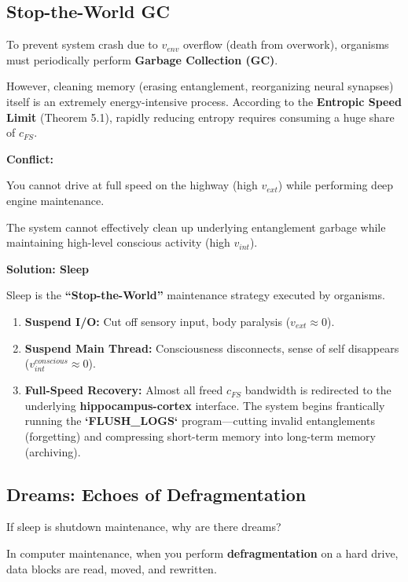 \documentclass[11pt,a4paper,twoside]{book}
\begin{document}
\subsection{Stop-the-World GC}

To prevent system crash due to \textbf{$v_{env}$} overflow (death from overwork), organisms must periodically perform \textbf{Garbage Collection (GC)}.

However, cleaning memory (erasing entanglement, reorganizing neural synapses) itself is an extremely energy-intensive process. According to the \textbf{Entropic Speed Limit} (Theorem 5.1), rapidly reducing entropy requires consuming a huge share of \textbf{$c_{FS}$}.

\textbf{Conflict:}

You cannot drive at full speed on the highway (high \textbf{$v_{ext}$}) while performing deep engine maintenance.

The system cannot effectively clean up underlying entanglement garbage while maintaining high-level conscious activity (high \textbf{$v_{int}$}).

\textbf{Solution: Sleep}

Sleep is the \textbf{``Stop-the-World''} maintenance strategy executed by organisms.

\begin{enumerate}
\item \textbf{Suspend I/O:} Cut off sensory input, body paralysis (\textbf{$v_{ext} \approx 0$}).

\item \textbf{Suspend Main Thread:} Consciousness disconnects, sense of self disappears (\textbf{$v_{int}^{conscious} \approx 0$}).

\item \textbf{Full-Speed Recovery:} Almost all freed \textbf{$c_{FS}$} bandwidth is redirected to the underlying \textbf{hippocampus-cortex} interface. The system begins frantically running the \textbf{`FLUSH\_LOGS`} program---cutting invalid entanglements (forgetting) and compressing short-term memory into long-term memory (archiving).
\end{enumerate}

\subsection{Dreams: Echoes of Defragmentation}

If sleep is shutdown maintenance, why are there dreams?

In computer maintenance, when you perform \textbf{defragmentation} on a hard drive, data blocks are read, moved, and rewritten.
\end{document}
